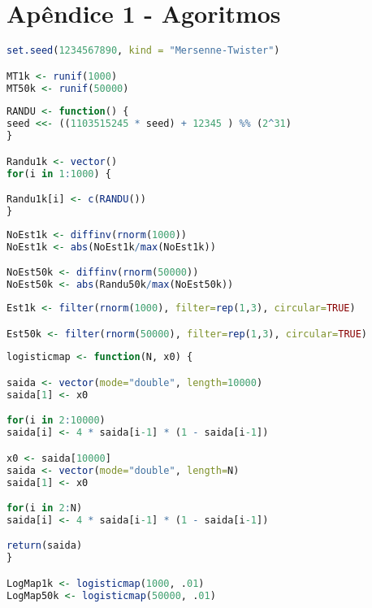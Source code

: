 \appendix

\chapter{Apêndice 1 - Agoritmos}\label{codigo}


\begin{lstlisting}[language=R, caption={Mersenne-Twister}, label=code:MersenneTwister]
set.seed(1234567890, kind = "Mersenne-Twister")

MT1k <- runif(1000)
MT50k <- runif(50000)
\end{lstlisting}

\begin{lstlisting}[language=R, caption={Randu}, label={code:Randu}]
RANDU <- function() {
seed <<- ((1103515245 * seed) + 12345 ) %% (2^31)
}

Randu1k <- vector()
for(i in 1:1000) {

Randu1k[i] <- c(RANDU())
}
\end{lstlisting}


\begin{lstlisting}[language=R, caption={Não Estacionária}, label={code:NaoEstacionaria}]
NoEst1k <- diffinv(rnorm(1000))
NoEst1k <- abs(NoEst1k/max(NoEst1k))

NoEst50k <- diffinv(rnorm(50000))
NoEst50k <- abs(Randu50k/max(NoEst50k))
\end{lstlisting}


\begin{lstlisting}[language=R, caption={Estacionária}, label={code:Estacionaria}]
Est1k <- filter(rnorm(1000), filter=rep(1,3), circular=TRUE)

Est50k <- filter(rnorm(50000), filter=rep(1,3), circular=TRUE)
\end{lstlisting}


\begin{lstlisting}[language=R, caption={Mapa Logístico}, label={code:MapaLogistico}]
logisticmap <- function(N, x0) {

saida <- vector(mode="double", length=10000)
saida[1] <- x0

for(i in 2:10000)
saida[i] <- 4 * saida[i-1] * (1 - saida[i-1])

x0 <- saida[10000]
saida <- vector(mode="double", length=N)
saida[1] <- x0

for(i in 2:N)
saida[i] <- 4 * saida[i-1] * (1 - saida[i-1])

return(saida)
}

LogMap1k <- logisticmap(1000, .01)
LogMap50k <- logisticmap(50000, .01)

\end{lstlisting}


\begin{lstlisting}[language=R, caption={}, label={code:}]

\end{lstlisting}
